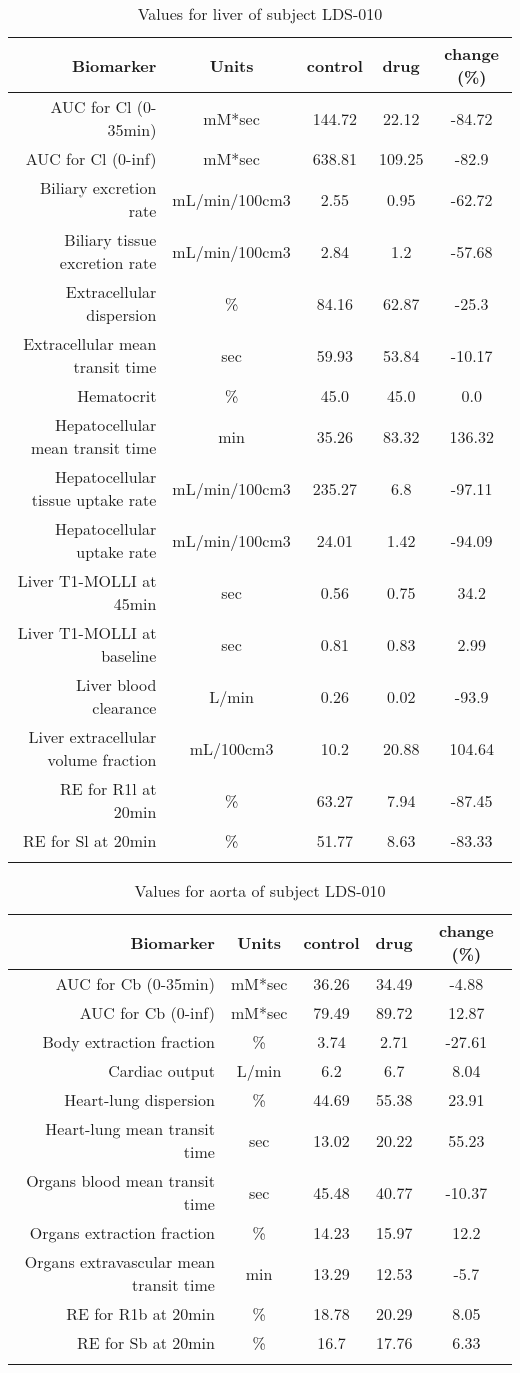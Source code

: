 \documentclass{epflreport}%
\begin{document}
%
\clearpage%
\begin{longtable}{rcccc}%
\hline%
Biomarker&Units&control&drug&change (\%)\\%
\hline%
AUC for Cl (0{-}35min)&mM*sec&144.72&22.12&{-}84.72\\%
AUC for Cl (0{-}inf)&mM*sec&638.81&109.25&{-}82.9\\%
Biliary excretion rate&mL/min/100cm3&2.55&0.95&{-}62.72\\%
Biliary tissue excretion rate&mL/min/100cm3&2.84&1.2&{-}57.68\\%
Extracellular dispersion&\%&84.16&62.87&{-}25.3\\%
Extracellular mean transit time&sec&59.93&53.84&{-}10.17\\%
Hematocrit&\%&45.0&45.0&0.0\\%
Hepatocellular mean transit time&min&35.26&83.32&136.32\\%
Hepatocellular tissue uptake rate&mL/min/100cm3&235.27&6.8&{-}97.11\\%
Hepatocellular uptake rate&mL/min/100cm3&24.01&1.42&{-}94.09\\%
Liver T1{-}MOLLI at 45min&sec&0.56&0.75&34.2\\%
Liver T1{-}MOLLI at baseline&sec&0.81&0.83&2.99\\%
Liver blood clearance&L/min&0.26&0.02&{-}93.9\\%
Liver extracellular volume fraction&mL/100cm3&10.2&20.88&104.64\\%
RE for R1l at 20min&\%&63.27&7.94&{-}87.45\\%
RE for Sl at 20min&\%&51.77&8.63&{-}83.33\\%
\hline%
\caption{Values for liver of subject LDS-010} \\%
\end{longtable}%
\begin{longtable}{rcccc}%
\hline%
Biomarker&Units&control&drug&change (\%)\\%
\hline%
AUC for Cb (0{-}35min)&mM*sec&36.26&34.49&{-}4.88\\%
AUC for Cb (0{-}inf)&mM*sec&79.49&89.72&12.87\\%
Body extraction fraction&\%&3.74&2.71&{-}27.61\\%
Cardiac output&L/min&6.2&6.7&8.04\\%
Heart{-}lung dispersion&\%&44.69&55.38&23.91\\%
Heart{-}lung mean transit time&sec&13.02&20.22&55.23\\%
Organs blood mean transit time&sec&45.48&40.77&{-}10.37\\%
Organs extraction fraction&\%&14.23&15.97&12.2\\%
Organs extravascular mean transit time&min&13.29&12.53&{-}5.7\\%
RE for R1b at 20min&\%&18.78&20.29&8.05\\%
RE for Sb at 20min&\%&16.7&17.76&6.33\\%
\hline%
\caption{Values for aorta of subject LDS-010} \\%
\end{longtable}%
\clearpage%
\end{document}
